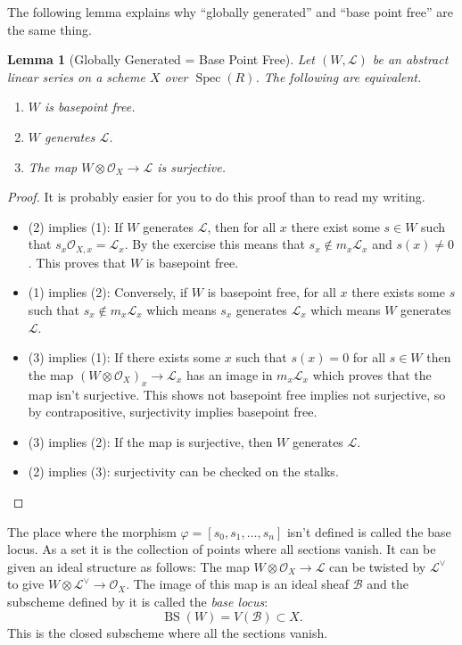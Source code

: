 \documentclass[12pt]{article}
\numberwithin{equation}{section}
\newtheorem{lemma}[theorem]{Lemma}
\theoremstyle{definition}
\theoremstyle{remark}
\newcommand{\Ocal}{\mathcal{O}}
\newcommand{\Spec}{\operatorname{Spec}}
\newcommand{\Lcal}{\mathcal{L}}
\newcommand{\BS}{\operatorname{BS}}
\begin{document}
The following lemma explains why ``globally generated'' and ``base point free'' are the same thing. 
\begin{lemma}[Globally Generated = Base Point Free]
Let $(W,\Lcal)$ be an abstract linear series on a scheme $X$ over $\Spec(R)$. 
The following are equivalent. 
	\begin{enumerate}
		\item $W$ is basepoint free.
		\item $W$ generates $\Lcal$.
		\item The map $W\otimes \Ocal_X \to \Lcal$ is surjective. 
	\end{enumerate}
\end{lemma}
\begin{proof}
	It is probably easier for you to do this proof than to read my writing. 
	
	\begin{itemize}
	\item (2) implies (1): If $W$ generates $\Lcal$, then for all $x$ there exist some $s\in W$ such that $s_x \Ocal_{X,x} = \Lcal_x$. 
	By the exercise this means that $s_x \notin m_x \Lcal_x$ and $s(x) \neq 0$. 
	This proves that $W$ is basepoint free.  
	
	\item (1) implies (2): Conversely, if $W$ is basepoint free, for all $x$ there exists some $s$ such that $s_x \notin m_x\Lcal_x$ which means $s_x$ generates $\Lcal_x$ which means $W$ generates $\Lcal$. 
	
	\item (3) implies (1): If there exists some $x$ such that $s(x)=0$ for all $s\in W$ then the map $(W\otimes \Ocal_X)_x \to \Lcal_x$ has an image in $m_x\Lcal_x$ which proves that the map isn't surjective. 
	This shows not basepoint free implies not surjective, so by contrapositive, surjectivity implies basepoint free. 
	
	\item (3) implies (2): If the map is surjective, then $W$ generates $\Lcal$.
	
	\item (2) implies (3): surjectivity can be checked on the stalks. 
	\end{itemize}
\end{proof}
The place where the morphism $\varphi=[s_0,s_1,\ldots,s_n]$ isn't defined is called the base locus.
As a set it is the collection of points where all sections vanish. 
It can be given an ideal structure as follows:
The map $W\otimes \Ocal_X \to \Lcal$ can be twisted by $\Lcal^{\vee}$ to give $W\otimes \Lcal^{\vee} \to \Ocal_X$.
The image of this map is an ideal sheaf $\mathcal{B}$ and the subscheme defined by it is called the \emph{base locus}:
$$ \BS(W) = V(\mathcal{B}) \subset X.$$
This is the closed subscheme where all the sections vanish.
\end{document}
